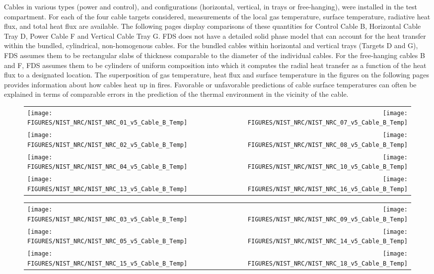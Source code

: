 Cables in various types (power and control), and configurations (horizontal, vertical, in trays or free-hanging), were installed in
the test compartment.
For each of the four cable targets considered, measurements of the local gas temperature, surface temperature, radiative heat flux,
and total heat flux are available.  The following pages display comparisons of these quantities for
Control Cable B, Horizontal Cable Tray D, Power Cable F and Vertical Cable Tray G.
FDS does not have a detailed solid phase model that can account for the heat transfer within the bundled,
cylindrical, non-homogenous cables.  For the bundled cables within horizontal and vertical trays (Targets D and G),
FDS assumes them to be rectangular slabs of thickness comparable to the diameter of the individual cables.
For the free-hanging cables B and F, FDS assumes them to be cylinders of uniform composition into which it
computes the radial heat transfer as a function of the heat flux to a designated location.
The superposition of gas temperature, heat flux and surface temperature in the figures on the following pages
provides information about how cables heat up in fires.  Favorable or unfavorable predictions of cable surface
temperatures can often be explained in terms of comparable errors in the prediction of the thermal environment in the vicinity of the cable.

\begin{figure}[p]
\begin{tabular*}{\textwidth}{l@{\extracolsep{\fill}}r}
\texttt{[image: FIGURES/NIST\_NRC/NIST\_NRC\_01\_v5\_Cable\_B\_Temp]} &
\texttt{[image: FIGURES/NIST\_NRC/NIST\_NRC\_07\_v5\_Cable\_B\_Temp]} \\
\texttt{[image: FIGURES/NIST\_NRC/NIST\_NRC\_02\_v5\_Cable\_B\_Temp]} &
\texttt{[image: FIGURES/NIST\_NRC/NIST\_NRC\_08\_v5\_Cable\_B\_Temp]} \\
\texttt{[image: FIGURES/NIST\_NRC/NIST\_NRC\_04\_v5\_Cable\_B\_Temp]} &
\texttt{[image: FIGURES/NIST\_NRC/NIST\_NRC\_10\_v5\_Cable\_B\_Temp]} \\
\texttt{[image: FIGURES/NIST\_NRC/NIST\_NRC\_13\_v5\_Cable\_B\_Temp]} &
\texttt{[image: FIGURES/NIST\_NRC/NIST\_NRC\_16\_v5\_Cable\_B\_Temp]}
\end{tabular*}
\label{NIST_NRC_Cable_B_Closed}
\end{figure}

\begin{figure}[p]
\begin{tabular*}{\textwidth}{l@{\extracolsep{\fill}}r}
\texttt{[image: FIGURES/NIST\_NRC/NIST\_NRC\_03\_v5\_Cable\_B\_Temp]} &
\texttt{[image: FIGURES/NIST\_NRC/NIST\_NRC\_09\_v5\_Cable\_B\_Temp]} \\
\texttt{[image: FIGURES/NIST\_NRC/NIST\_NRC\_05\_v5\_Cable\_B\_Temp]} &
\texttt{[image: FIGURES/NIST\_NRC/NIST\_NRC\_14\_v5\_Cable\_B\_Temp]} \\
\texttt{[image: FIGURES/NIST\_NRC/NIST\_NRC\_15\_v5\_Cable\_B\_Temp]} &
\texttt{[image: FIGURES/NIST\_NRC/NIST\_NRC\_18\_v5\_Cable\_B\_Temp]}
\end{tabular*}
\label{NIST_NRC_Cable_B_Open}
\end{figure}

